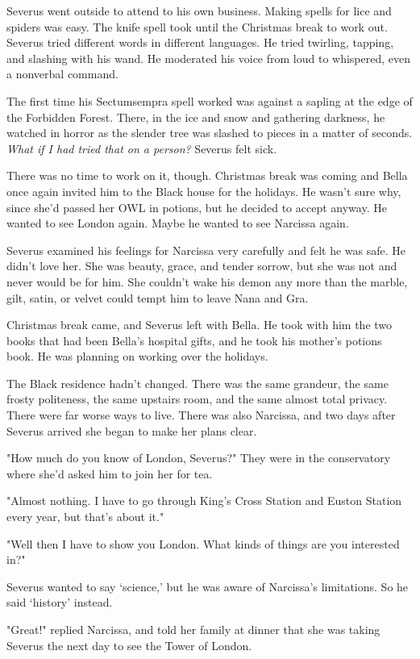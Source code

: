 Severus went outside to attend to his own business. Making spells for lice and spiders was easy. The knife spell took until the Christmas break to work out. Severus tried different words in different languages. He tried twirling, tapping, and slashing with his wand. He moderated his voice from loud to whispered, even a nonverbal command.

The first time his Sectumsempra spell worked was against a sapling at the edge of the Forbidden Forest. There, in the ice and snow and gathering darkness, he watched in horror as the slender tree was slashed to pieces in a matter of seconds. \emph{What if I had tried that on a person?} Severus felt sick.

There was no time to work on it, though. Christmas break was coming and Bella once again invited him to the Black house for the holidays. He wasn't sure why, since she'd passed her OWL in potions, but he decided to accept anyway. He wanted to see London again. Maybe he wanted to see Narcissa again.

Severus examined his feelings for Narcissa very carefully and felt he was safe. He didn't love her. She was beauty, grace, and tender sorrow, but she was not and never would be for him. She couldn't wake his demon any more than the marble, gilt, satin, or velvet could tempt him to leave Nana and Gra.

Christmas break came, and Severus left with Bella. He took with him the two books that had been Bella's hospital gifts, and he took his mother's potions book. He was planning on working over the holidays.

The Black residence hadn't changed. There was the same grandeur, the same frosty politeness, the same upstairs room, and the same almost total privacy. There were far worse ways to live. There was also Narcissa, and two days after Severus arrived she began to make her plans clear.

"How much do you know of London, Severus?" They were in the conservatory where she'd asked him to join her for tea.

"Almost nothing. I have to go through King's Cross Station and Euston Station every year, but that's about it."

"Well then I have to show you London. What kinds of things are you interested in?"

Severus wanted to say `science,' but he was aware of Narcissa's limitations. So he said `history' instead.

"Great!" replied Narcissa, and told her family at dinner that she was taking Severus the next day to see the Tower of London.

